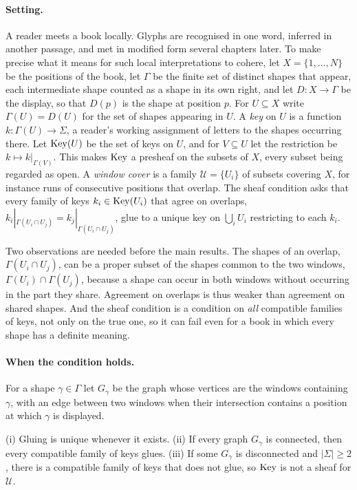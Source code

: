 \paragraph{Setting.}
A reader meets a book locally. Glyphs are recognised in one word, inferred in another passage, and met in modified form several chapters later. To make precise what it means for such local interpretations to cohere, let $X=\{1,\dots,N\}$ be the positions of the book, let $\Gamma$ be the finite set of distinct shapes that appear, each intermediate shape counted as a shape in its own right, and let $D:X\to\Gamma$ be the display, so that $D(p)$ is the shape at position $p$. For $U\subseteq X$ write $\Gamma(U)=D(U)$ for the set of shapes appearing in $U$. A \emph{key} on $U$ is a function $k:\Gamma(U)\to\Sigma$, a reader's working assignment of letters to the shapes occurring there. Let $\mathrm{Key}(U)$ be the set of keys on $U$, and for $V\subseteq U$ let the restriction be $k\mapsto k|_{\Gamma(V)}$. This makes $\mathrm{Key}$ a presheaf on the subsets of $X$, every subset being regarded as open. A \emph{window cover} is a family $\mathcal{U}=\{U_i\}$ of subsets covering $X$, for instance runs of consecutive positions that overlap. The sheaf condition asks that every family of keys $k_i\in\mathrm{Key}(U_i)$ that agree on overlaps, $k_i|_{\Gamma(U_i\cap U_j)}=k_j|_{\Gamma(U_i\cap U_j)}$, glue to a unique key on $\bigcup_iU_i$ restricting to each $k_i$.

Two observations are needed before the main results. The shapes of an overlap, $\Gamma(U_i\cap U_j)$, can be a proper subset of the shapes common to the two windows, $\Gamma(U_i)\cap\Gamma(U_j)$, because a shape can occur in both windows without occurring in the part they share. Agreement on overlaps is thus weaker than agreement on shared shapes. And the sheaf condition is a condition on \emph{all} compatible families of keys, not only on the true one, so it can fail even for a book in which every shape has a definite meaning.

\paragraph{When the condition holds.}
For a shape $\gamma\in\Gamma$ let $G_\gamma$ be the graph whose vertices are the windows containing $\gamma$, with an edge between two windows when their intersection contains a position at which $\gamma$ is displayed.

\begin{proposition}\label{prop:gluing}
(i) Gluing is unique whenever it exists. (ii) If every graph $G_\gamma$ is connected, then every compatible family of keys glues. (iii) If some $G_\gamma$ is disconnected and $|\Sigma|\ge2$, there is a compatible family of keys that does not glue, so $\mathrm{Key}$ is not a sheaf for $\mathcal{U}$.
\end{proposition}

